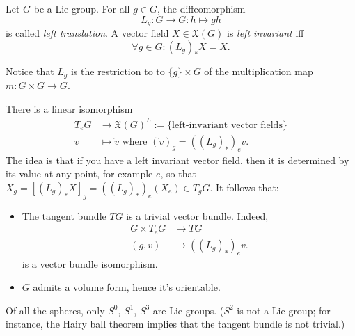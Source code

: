 \begin{definition}
    Let $G$ be a Lie group.
    For all $g \in G$, the diffeomorphism    \[
        L_g: G \to  G: h \mapsto  gh   
    \]
    is called \emph{left translation}. 
    A vector field $X \in \mathfrak{X}(G)$ is \emph{left invariant} iff
    \[
        \forall g \in G: (L_g)_* X = X
    .\] 
\end{definition}
Notice that  $L_g$  is the restriction to  to $\{g\} \times G$ of the multiplication map  $m: G \times G \to  G$.

\begin{remark}
    There is a linear isomorphism 
    \begin{align*}
        T_e G &\longrightarrow \mathfrak{X}(G)^{L} := \{ \text{left-invariant vector fields}\} \\
        v &\longmapsto  \overleftarrow v \text{ where } (\overleftarrow v)_g = ((L_g)_*)_e v
    .\end{align*} 
    The idea is that if you have a left invariant vector field, then it is determined by its value at any point, for example $e$, so that
    $
    X_g = [(L_g)_* X]_g = ((L_g)_*)_e (X_e) \in T_g G
    .$
    \filbreak
    It follows that:
    \begin{itemize}
        \item  The tangent bundle $TG$ is a trivial vector bundle.
            Indeed, 
            \begin{align*}
                G \times  T_e G &\longrightarrow TG\\
                (g, v) & \longmapsto ((L_g)_*)_e v 
            .\end{align*} 
            is a vector bundle isomorphism.

        \item $G$ admits a volume form, hence it's orientable.
    \end{itemize}
\end{remark}

\begin{eg}
Of all the spheres, only $S^0$, $S^1$, $S^3$ are Lie groups.
($S^2$ is not a Lie group; for instance,  the Hairy ball theorem implies that the tangent bundle is not trivial.)
\end{eg}


